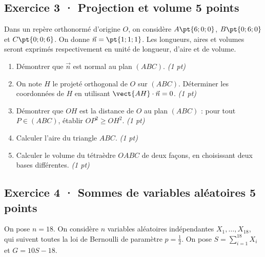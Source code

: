 \mxnewpage{}

\subsection*{Exercice 3 · Projection et volume \hfill 5 points}Dans un repère orthonormé d'origine $O$, on considère $A\pt{6;0;0}$, $B\pt{0;6;0}$ et $C\pt{0;0;6}$. On donne $\vec n=\pt{1;1;1}$. Les longueurs, aires et volumes seront exprimés respectivement en unité de longueur, d'aire et de volume.

\begin{enumerate}

\item Démontrer que $\vec n$ est normal au plan $(ABC)$. \hfill\textit{(1 pt)}

\item On note $H$ le projeté orthogonal de $O$ sur $(ABC)$. Déterminer les coordonnées de $H$ en utilisant $\vect{AH}\cdot\vec n=0$. \hfill\textit{(1 pt)}

\item Démontrer que $OH$ est la distance de $O$ au plan $(ABC)$ : pour tout $P\in(ABC)$, établir $OP^2\ge OH^2$. \hfill\textit{(1 pt)}

\item Calculer l'aire du triangle $ABC$. \hfill\textit{(1 pt)}

\item Calculer le volume du tétraèdre $OABC$ de deux façons, en choisissant deux bases différentes. \hfill\textit{(1 pt)}

\end{enumerate}

\subsection*{Exercice 4 · Sommes de variables aléatoires \hfill 5 points}On pose $n=18$. On considère $n$ variables aléatoires indépendantes $X_1,\ldots,X_{18}$, qui suivent toutes la loi de Bernoulli de paramètre $p=\frac{1}{2}$. On pose $S=\displaystyle\sum_{i=1}^{18}X_i$ et $G=10S-18$.

